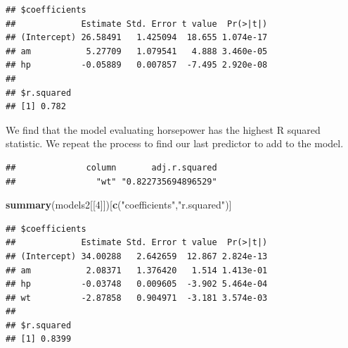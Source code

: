 \documentclass[]{article}
\newenvironment{Shaded}{\begin{snugshade}}{\end{snugshade}}
\newcommand{\KeywordTok}[1]{\textcolor[rgb]{0.13,0.29,0.53}{\textbf{{#1}}}}
\newcommand{\DataTypeTok}[1]{\textcolor[rgb]{0.13,0.29,0.53}{{#1}}}
\newcommand{\DecValTok}[1]{\textcolor[rgb]{0.00,0.00,0.81}{{#1}}}
\newcommand{\StringTok}[1]{\textcolor[rgb]{0.31,0.60,0.02}{{#1}}}
\newcommand{\OtherTok}[1]{\textcolor[rgb]{0.56,0.35,0.01}{{#1}}}
\newcommand{\NormalTok}[1]{{#1}}
\begin{document}
\begin{verbatim}
## $coefficients
##             Estimate Std. Error t value  Pr(>|t|)
## (Intercept) 26.58491   1.425094  18.655 1.074e-17
## am           5.27709   1.079541   4.888 3.460e-05
## hp          -0.05889   0.007857  -7.495 2.920e-08
## 
## $r.squared
## [1] 0.782
\end{verbatim}

We find that the model evaluating horsepower has the highest R squared
statistic. We repeat the process to find our last predictor to add to
the model.

\begin{Shaded}
\end{Shaded}

\begin{verbatim}
##              column       adj.r.squared 
##                "wt" "0.822735694896529"
\end{verbatim}

\begin{Shaded}
\begin{Highlighting}[]
\KeywordTok{summary}\NormalTok{(models2[[}\DecValTok{4}\NormalTok{]])[}\KeywordTok{c}\NormalTok{(}\StringTok{"coefficients"}\NormalTok{,}\StringTok{"r.squared"}\NormalTok{)]}
\end{Highlighting}
\end{Shaded}

\begin{verbatim}
## $coefficients
##             Estimate Std. Error t value  Pr(>|t|)
## (Intercept) 34.00288   2.642659  12.867 2.824e-13
## am           2.08371   1.376420   1.514 1.413e-01
## hp          -0.03748   0.009605  -3.902 5.464e-04
## wt          -2.87858   0.904971  -3.181 3.574e-03
## 
## $r.squared
## [1] 0.8399
\end{verbatim}
\end{document}
